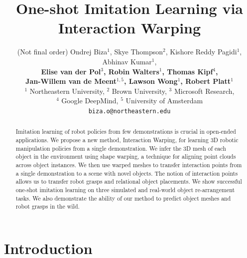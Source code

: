 \documentclass{article}
\title{One-shot Imitation Learning via Interaction Warping}
\author{
  (Not final order) Ondrej Biza$^1$, Skye Thompson$^2$, Kishore Reddy Pagidi$^1$, Abhinav Kumar$^1$, \\
  \textbf{Elise van der Pol$^3$, Robin Walters$^1$, Thomas Kipf$^4$,} \\
  \textbf{Jan-Willem van de Meent$^{1,5}$, Lawson Wong$^1$, Robert Platt$^1$} \\
  $^1$ Northeastern University, $^2$ Brown University, $^3$ Microsoft Research, \\$^4$ Google DeepMind, $^5$ University of Amsterdam \\
  \texttt{biza.o@northeastern.edu} \\
}
\newcommand{\ob}[1]{\textcolor{purple}{[\textbf{OB:} #1]}}
\begin{document}
\maketitle


\begin{abstract}
Imitation learning of robot policies from few demonstrations is crucial in open-ended applications. We propose a new method, Interaction Warping, for learning 3D robotic manipulation policies from a single demonstration. We infer the 3D mesh of each object in the environment using shape warping, a technique for aligning point clouds across object instances. We then use warped meshes to transfer interaction points from a single demonstration to a scene with novel objects. The notion of interaction points allows us to transfer robot grasps and relational object placements. We show successful one-shot imitation learning on three simulated and real-world object re-arrangement tasks. We also demonstrate the ability of our method to predict object meshes and robot grasps in the wild.
\end{abstract}




\section{Introduction}


\end{document}
